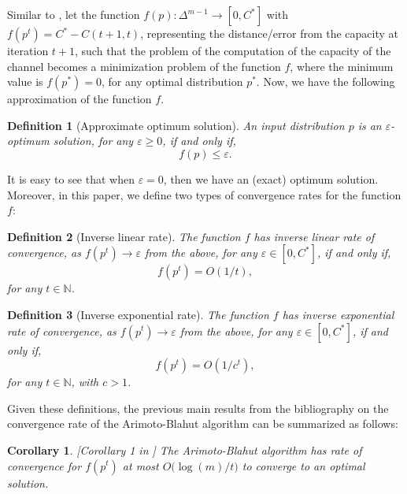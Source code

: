 \documentclass[11pt, letterpaper]{article}
\newtheorem{definition}{Definition}
\newtheorem{corollary}{Corollary}
\begin{document}
Similar to \cite{Arimoto1972AnAF}, let the function $f(p):\Delta^{m-1} \to [0,C^*]$ with $f(p^{t}) = C^* - C(t+1, t)$, representing the distance/error from the capacity at iteration $t+1$, such that the problem of the computation of the capacity of the channel becomes a minimization problem of the function $f$, where the minimum value is $f(p^*)=0$, for any optimal distribution $p^*$. Now, we have the following approximation of the function $f$. 

\begin{definition}[Approximate optimum solution]
An input distribution $p$ is an $\varepsilon$-optimum solution, for any $\varepsilon\geq 0$, if and only if,
\begin{equation*}
    f(p)\leq \varepsilon.
\end{equation*}
\end{definition} 
\noindent It is easy to see that when $\varepsilon = 0$, then we have an (exact) optimum solution.
 Moreover, in this paper, we define two types of convergence rates for the function $f$:

\begin{definition}[Inverse linear rate]
The function $f$ has inverse linear rate of convergence, as $f(p^t) \to \varepsilon$ from the above, for any $\varepsilon\in [0,C^*]$, if and only if,
\begin{equation*}
    f(p^t) = O(1/t),
\end{equation*}
for any $t \in \mathbb{N}$.
\end{definition}

\begin{definition}[Inverse exponential rate]
The function $f$ has inverse exponential rate of convergence, as $f(p^t) \to \varepsilon$ from the above, for any $\varepsilon\in [0,C^*]$, if and only if,
\begin{equation*}
    f(p^t) = O(1/c^t),
\end{equation*}
for any $t \in \mathbb{N}$, with $c>1$.
\end{definition} 

\noindent Given these definitions, the previous main results from the bibliography on the convergence rate of the Arimoto-Blahut algorithm can be summarized as follows:

\begin{corollary}\label{cor:Arimoto-Blahut rate of convergence} [Corollary 1 in \cite{Arimoto1972AnAF}] The Arimoto-Blahut algorithm has rate of convergence for $f(p^t)$ at most $O\Big({\log(m)}/{t}\Big)$ to converge to an optimal solution.
\end{corollary}
\end{document}
